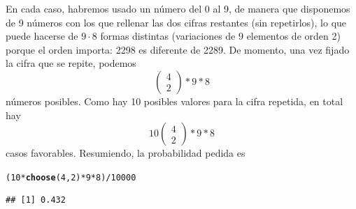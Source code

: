 \documentclass[10pt,a4paper]{article}\usepackage[]{graphicx}\usepackage[]{color}
\makeatletter
\newcommand{\hlnum}[1]{\textcolor[rgb]{0.686,0.059,0.569}{#1}}%
\newcommand{\hlopt}[1]{\textcolor[rgb]{0,0,0}{#1}}%
\newcommand{\hlstd}[1]{\textcolor[rgb]{0.345,0.345,0.345}{#1}}%
\newcommand{\hlkwd}[1]{\textcolor[rgb]{0.737,0.353,0.396}{\textbf{#1}}}%
\newenvironment{kframe}{%
 \def\at@end@of@kframe{}%
 \ifinner\ifhmode%
  \def\at@end@of@kframe{\end{minipage}}%
  \begin{minipage}{\columnwidth}%
 \fi\fi%
 \def\FrameCommand##1{\hskip\@totalleftmargin \hskip-\fboxsep
 \colorbox{shadecolor}{##1}\hskip-\fboxsep
     \hskip-\linewidth \hskip-\@totalleftmargin \hskip\columnwidth}%
 \MakeFramed {\advance\hsize-\width
   \@totalleftmargin\z@ \linewidth\hsize
   \@setminipage}}%
 {\par\unskip\endMakeFramed%
 \at@end@of@kframe}
\newenvironment{knitrout}{}{} %
\makeatother
\begin{document}
\begin{enumerate}
 En cada caso, habremos usado un número del 0 al 9, de manera que disponemos de 9 números con los que rellenar las dos cifras restantes (sin repetirlos), lo que puede hacerse de $9\cdot 8$ formas distintas (variaciones de 9 elementos de orden 2) porque el orden importa: 2298 es diferente de 2289. De momento, una vez fijado la cifra que se repite, podemos 
 \[\left(\begin{array}{c} 4 \\ 2 \end{array} \right)*9*8\]
n\'umeros posibles. Como hay 10 posibles valores para la cifra repetida, en total hay 
 \[10\left(\begin{array}{c} 4 \\ 2 \end{array} \right)*9*8\]
 casos favorables. Resumiendo, la probabilidad pedida es 
\begin{knitrout}
\color{fgcolor}\begin{kframe}
\begin{alltt}
\hlstd{(}\hlnum{10}\hlopt{*}\hlkwd{choose}\hlstd{(}\hlnum{4}\hlstd{,}\hlnum{2}\hlstd{)}\hlopt{*}\hlnum{9}\hlopt{*}\hlnum{8}\hlstd{)}\hlopt{/}\hlnum{10000}
\end{alltt}
\begin{verbatim}
## [1] 0.432
\end{verbatim}
\end{kframe}
\end{knitrout}




\end{enumerate}
\end{document}
